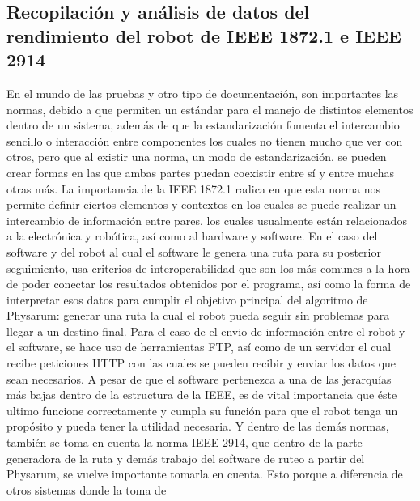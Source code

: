 \subsection{Recopilaci\'on y an\'alisis de datos del rendimiento del robot de IEEE 1872.1 e IEEE 2914}
    En el mundo de las pruebas y otro tipo de documentaci\'on,
        son importantes las normas, debido a que permiten un
        est\'andar para el manejo de distintos elementos dentro de un
        sistema, adem\'as de que la estandarizaci\'on fomenta el
        intercambio sencillo o interacci\'on entre componentes los cuales no tienen mucho que ver con otros, pero que al existir
        una norma, un modo de estandarizaci\'on, se pueden crear
        formas en las que ambas partes puedan coexistir entre s\'i y
        entre muchas otras m\'as.
    \vskip 0.5cm
    La importancia de la IEEE 1872.1 radica en que esta norma
        nos permite definir ciertos elementos y contextos en los
        cuales se puede realizar un intercambio de informaci\'on entre
        pares, los cuales usualmente est\'an relacionados a la
        electr\'onica y rob\'otica, as\'i como al hardware y software.
        En el caso del software y del robot al cual el software le
        genera una ruta para su posterior seguimiento, usa criterios
        de interoperabilidad que son los m\'as comunes a la hora de
        poder conectar los resultados obtenidos por el programa, as\'i
        como la forma de interpretar esos datos para cumplir el
        objetivo principal del algoritmo de Physarum: generar una
        ruta la cual el robot pueda seguir sin problemas para llegar a
        un destino final.
    \vskip 0.5cm
    Para el caso de el envio de informaci\'on entre
        el robot y el software, se hace uso de herramientas FTP, as\'i
        como de un servidor el cual recibe peticiones HTTP con las
        cuales se pueden recibir y enviar los datos que sean
        necesarios.
    \vskip 0.5cm
    A pesar de que el software pertenezca a una de las jerarqu\'ias
        m\'as bajas dentro de la estructura de la IEEE, es de vital
        importancia que \'este ultimo funcione correctamente y
        cumpla su funci\'on para que el robot tenga un prop\'osito y
        pueda tener la utilidad necesaria.
    \vskip 0.5cm
    Y dentro de las dem\'as normas, tambi\'en se toma en cuenta la
        norma IEEE 2914, que dentro de la parte generadora de la
        ruta y dem\'as trabajo del software de ruteo a partir del
        Physarum, se vuelve importante tomarla en cuenta. Esto
        porque a diferencia de otros sistemas donde la toma de
